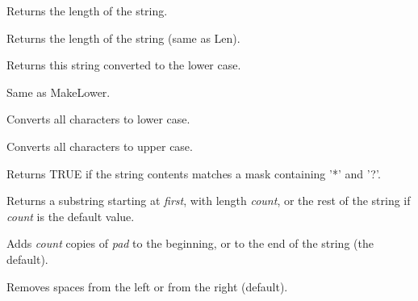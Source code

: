 {\label{wxstringlen}


Returns the length of the string.

\label{wxstringlength}


Returns the length of the string (same as Len).

\label{wxstringlower}


Returns this string converted to the lower case.

\label{wxstringlowercase}


Same as MakeLower.

\label{wxstringmakelower}


Converts all characters to lower case.

\label{wxstringmakeupper}


Converts all characters to upper case.

\label{wxstringmatches}


Returns TRUE if the string contents matches a mask containing '*' and '?'.

\label{wxstringmid}


Returns a substring starting at {\it first}, with length {\it count}, or the rest of
the string if {\it count} is the default value.

\label{wxstringpad}


Adds {\it count} copies of {\it pad} to the beginning, or to the end of the string (the default).

Removes spaces from the left or from the right (default).

}
